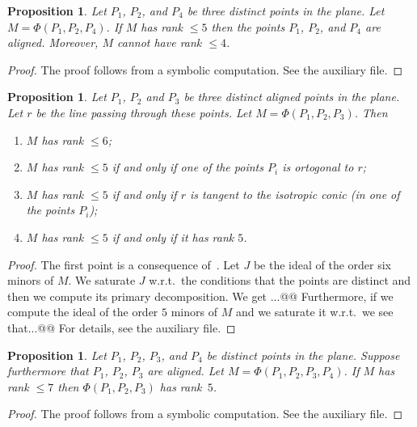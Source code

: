 \documentclass[12pt, a4paper, reqno, captions=tableheading,bibliography=totoc]{scrartcl}
\theoremstyle{plain}
\newtheorem{prop}[lemma]{Proposition}
\theoremstyle{definition}
\begin{document}
\begin{prop}
\label{prop:condition_rank_aligned}
 Let $P_1$, $P_2$, and $P_4$ be three distinct points in the plane.
 Let $M = \Phi(P_1, P_2, P_4)$.
 If $M$ has rank $\leq 5$ then the points $P_1$, $P_2$, and $P_4$ are aligned.
 Moreover, $M$ cannot have rank $\leq 4$.
\end{prop}
\begin{proof}
 The proof follows from a symbolic computation. See the auxiliary file.
\end{proof}

\begin{prop}
  \label{prop:rank3points}
  Let $P_1$, $P_2$ and $P_3$ be three distinct aligned points in the plane.
  Let $r$ be the line passing through these points.
  Let $M = \Phi(P_1, P_2, P_3)$.
  Then
  \begin{enumerate}
  \item $M$ has rank $\leq 6$;
  \item $M$ has rank $\leq 5$ if and only if one of the points $P_i$ is
    ortogonal to $r$;
  \item $M$ has rank $\leq 5$ if and only if $r$ is tangent to the
    isotropic conic (in one of the points $P_i$);
  \item $M$ has rank $\leq 5$ if and only if it has rank $5$.
  \end{enumerate}
\end{prop}
\begin{proof}
The first point is a consequence of~. Let $J$ be the ideal 
of the order six minors of $M$. We saturate $J$ w.r.t.\ the conditions that
the points are distinct and then we compute its primary decomposition.
We get ...@@ Furthermore, if we compute the ideal of the order $5$ minors of
$M$ and we saturate it w.r.t.\ we see that...@@
%
For details, see the auxiliary file.
\end{proof}

\begin{prop}
\label{prop:condition_rank_aligned3}
 Let $P_1$, $P_2$, $P_3$, and $P_4$ be distinct points in the plane.
 Suppose furthermore that $P_1$, $P_2$, $P_3$ are aligned.
 Let $M = \Phi(P_1, P_2, P_3, P_4)$.
 If $M$ has rank $\leq 7$ then $\Phi(P_1, P_2, P_3)$ has rank~$5$.
\end{prop}
\begin{proof}
 The proof follows from a symbolic computation. See the auxiliary file.
\end{proof}
\end{document}

